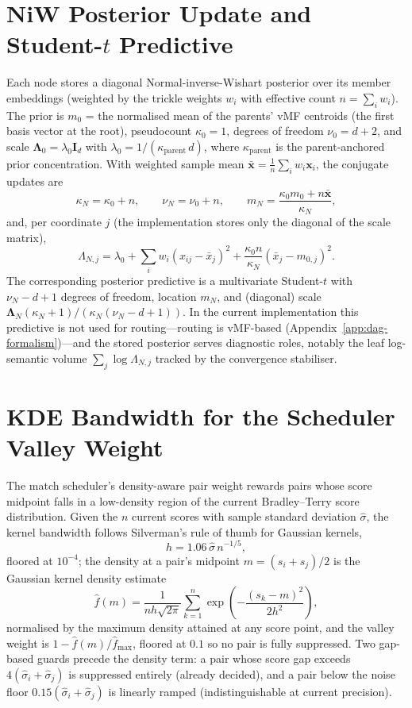\section{NiW Posterior Update and Student-$t$ Predictive}\label{sec:num-niw}

Each node stores a diagonal Normal-inverse-Wishart posterior over its
member embeddings (weighted by the trickle weights $w_i$ with
effective count $n = \sum_i w_i$).
The prior is
$m_0$ = the normalised mean of the parents' vMF centroids (the first
basis vector at the root), pseudocount $\kappa_0 = 1$, degrees of
freedom $\nu_0 = d + 2$, and scale
$\boldsymbol{\Lambda}_0 = \lambda_0 \mathbf{I}_d$ with $\lambda_0 =
1/(\kappa_{\text{parent}}\, d)$, where $\kappa_{\text{parent}}$ is
the parent-anchored prior concentration.
With weighted sample mean
$\bar{\mathbf{x}} = \tfrac{1}{n}\sum_i w_i \mathbf{x}_i$, the
conjugate updates are
\[
\kappa_N = \kappa_0 + n,
\qquad
\nu_N = \nu_0 + n,
\qquad
m_N = \frac{\kappa_0 m_0 + n \bar{\mathbf{x}}}{\kappa_N},
\]
and, per coordinate $j$ (the implementation stores only the diagonal
of the scale matrix),
\[
\Lambda_{N,j}
= \lambda_0
+ \sum_i w_i \left(x_{ij} - \bar{x}_j\right)^2
+ \frac{\kappa_0 n}{\kappa_N}\left(\bar{x}_j - m_{0,j}\right)^2 .
\]
The corresponding posterior predictive is a multivariate Student-$t$
with $\nu_N - d + 1$ degrees of freedom, location $m_N$, and (diagonal)
scale $\boldsymbol{\Lambda}_N (\kappa_N + 1) / (\kappa_N (\nu_N - d +
1))$.
In the current implementation this predictive is not used for
routing---routing is vMF-based
(Appendix~\ref{app:dag-formalism})---and the stored posterior serves
diagnostic roles, notably the leaf log-semantic volume
$\sum_j \log \Lambda_{N,j}$ tracked by the convergence stabiliser.

\section{KDE Bandwidth for the Scheduler Valley Weight}\label{sec:num-kde}

The match scheduler's density-aware pair weight rewards pairs whose
score midpoint falls in a low-density region of the current
Bradley--Terry score distribution.
Given the $n$ current scores with sample standard deviation
$\hat{\sigma}$, the kernel bandwidth follows Silverman's rule of
thumb for Gaussian kernels,
\[
h = 1.06\, \hat{\sigma}\, n^{-1/5},
\]
floored at $10^{-4}$; the density at a pair's midpoint
$m = (s_i + s_j)/2$ is the Gaussian kernel density estimate
\[
\hat{f}(m) = \frac{1}{n h \sqrt{2\pi}}
\sum_{k=1}^{n} \exp\!\left(-\frac{(s_k - m)^2}{2h^2}\right),
\]
normalised by the maximum density attained at any score point, and
the valley weight is $1 - \hat{f}(m)/\hat{f}_{\max}$, floored at
$0.1$ so no pair is fully suppressed.
Two gap-based guards precede the density term: a pair whose score gap
exceeds $4(\hat{\sigma}_i + \hat{\sigma}_j)$ is suppressed entirely
(already decided), and a pair below the noise floor
$0.15(\hat{\sigma}_i + \hat{\sigma}_j)$ is linearly ramped
(indistinguishable at current precision).

